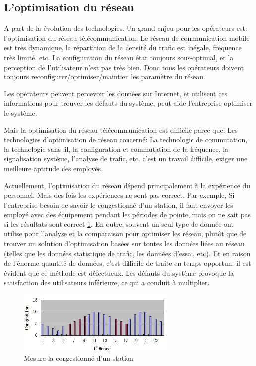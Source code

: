   \subsection{L'optimisation du réseau}
A part de la évolution des technologies. Un grand enjeu pour les opérateurs est: l'optimisation du réseau télécommunication. Le réseau de communication mobile est très dynamique, la répartition de la densité du trafic est inégale, fréquence très limité, etc. La configuration du réseau état toujours sous-optimal, et la perception de l'utilisateur n'est pas très bien. Donc tous les opérateurs doivent toujours reconfigurer/optimiser/maintien les paramètre du réseau.
  
Les opérateurs peuvent percevoir les données sur Internet, et utilisent ces informations pour trouver les défauts du système, peut aide l'entreprise optimiser le système.

Mais la optimisation du réseau télécommunication est difficile parce-que: Les technologies d'optimisation de réseau concerné: La technologie de commutation, la technologie sans fil, la configuration et commutation de la fréquence, la signalisation système, l'analyse de trafic, etc. c'est un travail difficile, exiger une meilleure aptitude des employés.  

Actuellement, l'optimisation du réseau dépend principalement à la expérience du personnel. Mais des fois les expériences ne sont pas correct. Par exemple, Si l'entreprise besoin de savoir le congestionné d'un station, il faut envoyer les employé avec des équipement pendant les périodes de pointe, mais on ne sait pas si les résultats sont correct \ref{meseau}.  En outre, souvent un seul type de  donnée ont utilise pour l'analyse et la comparaison pour optimiser les réseau, plutôt que de trouver un solution d'optimisation basées sur toutes les données liées au réseau (telles que les données statistique de trafic, les données d'essai, etc). Et en raison de l'énorme quantité de données, c'est difficile de traite en temps opportun. il est évident que ce méthode est défectueux. Les défauts du système provoque la satisfaction des utilisateurs inférieure, ce qui a conduit à multiplier.
      \begin{figure}[H]
          \centering
          \includegraphics[width=3in]{images/meseau.jpg}
          \caption{Mesure la congestionné d'un station}
          \label{meseau}
      \end{figure}
      
